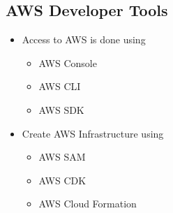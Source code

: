\documentclass[../main.tex]{subfiles}
\begin{document}
\subsection{AWS Developer Tools}
\begin{itemize}
    \item Access to AWS is done using
    \begin{itemize}
        \item AWS Console
        \item AWS CLI
        \item AWS SDK
    \end{itemize}
    \item Create AWS Infrastructure using
    \begin{itemize}
        \item AWS SAM
        \item AWS CDK
        \item AWS Cloud Formation
    \end{itemize}
\end{itemize}
\end{document}
